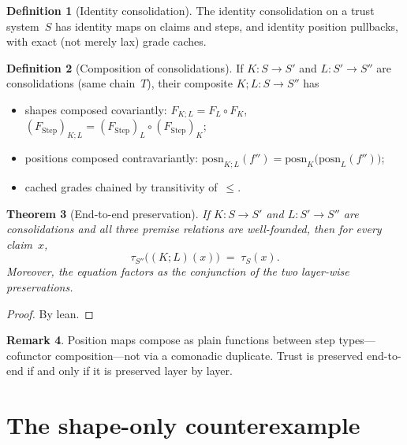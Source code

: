 \documentclass[11pt,a4paper]{article}
\theoremstyle{plain}
\newtheorem{theorem}{Theorem}[section]
\theoremstyle{definition}
\newtheorem{definition}[theorem]{Definition}
\newtheorem{remark}[theorem]{Remark}
\newcommand{\tauCan}{\tau}
\begin{document}
\begin{definition}[Identity consolidation]\label{def:id-consol}
The identity consolidation on a trust system~$S$ has identity maps on
claims and steps, and identity position pullbacks, with exact (not merely
lax) grade caches.
\end{definition}

\begin{definition}[Composition of consolidations]\label{def:comp-consol}
If $K : S \to S'$ and $L : S' \to S''$ are consolidations (same chain~$T$),
their composite $K ; L : S \to S''$ has
\begin{itemize}
  \item shapes composed covariantly:
        $F_{K;L} = F_L \circ F_K$,
        $(F_{\mathrm{Step}})_{K;L} =
         (F_{\mathrm{Step}})_L \circ (F_{\mathrm{Step}})_K$;
  \item positions composed contravariantly:
        $\mathrm{posn}_{K;L}(f'') =
         \mathrm{posn}_K\bigl(\mathrm{posn}_L(f'')\bigr)$;
  \item cached grades chained by transitivity of~$\le$.
\end{itemize}
\end{definition}

\begin{theorem}[End-to-end preservation]\label{thm:comp-preserve}
If $K : S \to S'$ and $L : S' \to S''$ are consolidations and all three
premise relations are well-founded, then for every claim~$x$,
\begin{equation}
  \tauCan_{S''}\bigl((K;L)(x)\bigr)
  \;=\;
  \tauCan_S(x).
\end{equation}
Moreover, the equation factors as the conjunction of the two layer-wise
preservations.
\end{theorem}

\begin{proof}
By lean.
\end{proof}

\begin{remark}
Position maps compose as plain functions between step types---cofunctor
composition---not via a comonadic duplicate. Trust is preserved end-to-end
if and only if it is preserved layer by layer.
\end{remark}

\section{The shape-only counterexample}
\end{document}
